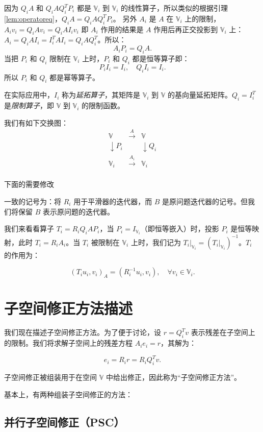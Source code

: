 \documentclass[letterpaper,12pt]{article}
\begin{document}
因为 $Q_iA$ 和 $Q_iAQ_i^TP_i$ 都是 $\mathbb{V}_i$ 到 $\mathbb{V}_i$
的线性算子，所以类似的根据引理 \ref{lem:operatoreq}，$Q_iA = Q_iAQ_i^TP_i$。
另外 $A_i$ 是 $A$ 在 $\mathbb{V}_i$ 上的限制， $A_iv_i = Q_i A v_i = 
Q_iAI_i v_i$ 即 $A_i$ 作用的结果是 $A$ 作用后再正交投影到 $\mathbb{V}_i$ 上：
$A_i = Q_i AI_i = I_i^TAI_i = Q_i A Q_i^T$。所以：
$$
A_iP_i = Q_iA.
$$
当把 $P_i$ 和 $Q_i$ 限制在 $\mathbb{V}_i$ 上时，$P_i$ 和 $Q_i$ 都是恒等算子即：
$$
P_i I_i = I_i, \quad Q_i I_i = I_i.
$$
所以 $P_i$ 和 $Q_i$ 都是幂等算子。

在实际应用中，$I_i$ 称为\emph{延拓算子}，其矩阵是 $\mathbb{V}_i$ 到 $\mathbb{V}$
的基向量延拓矩阵。$Q_i = I_i^T$ 是\emph{限制算子}，即 $\mathbb{V}$ 到 $\mathbb{V}_i$
的限制函数。

我们有如下交换图：
\[
\begin{array}{ccc}
\mathbb{V} & \xrightarrow{A} & \mathbb{V} \\
\downarrow P_i & & \downarrow Q_i \\
\mathbb{V}_i & \xrightarrow{A_i} & \mathbb{V}_i \\
\end{array}
\]

{\color{red} 下面的需要修改}


一致的记号为：将 $R_i$ 用于平滑器的迭代器，而 $B$ 是原问题迭代器的记号。但我们将保留 $B$ 表示原问题的迭代器。

我们来看看算子 $T_i = R_i Q_i A P_i$，当 $P_i = I_{\mathbb{V}_i}$（即恒等嵌入）时，投影 $P_i$ 是恒等映射，此时 $T_i = R_i A_i$。当 $T_i$ 被限制在 $\mathbb{V}_i$ 上时，我们记为 $T_i|_{\mathbb{V}_i} = (T_i|_{\mathbb{V}_i})^{-1}$。$T_i$ 的作用为：

\[
(T_i u_i, v_i)_A = (R_i^{-1} u_i, v_i), \quad \forall v_i \in \mathbb{V}_i.
\]

\section{子空间修正方法描述}

我们现在描述子空间修正方法。为了便于讨论，设 $r = Q_i^T v$ 表示残差在子空间上的限制。我们将求解子空间上的残差方程 $A_i e_i = r$，其解为：

\[
e_i = R_i r = R_i Q_i^T v.
\]

子空间修正被组装用于在空间 $\mathbb{V}$ 中给出修正，因此称为“子空间修正方法”。

基本上，有两种组装子空间修正的方法：

\subsection{并行子空间修正（PSC）}
\end{document}
